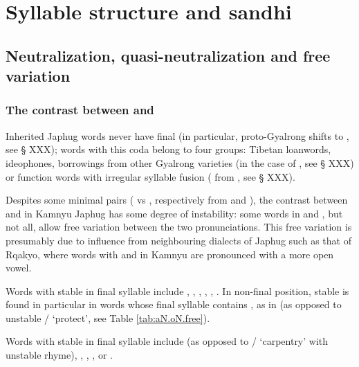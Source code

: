 \chapter{Syllable structure and sandhi} \label{sec:syllable}

\section{Neutralization, quasi-neutralization and free variation}

\subsection{The contrast between  and } \label{sec:aN.oN.free}
Inherited Japhug words never have final  (in particular, proto-Gyalrong  shifts to , see § XXX); words with this coda belong to four groups: Tibetan loanwords, ideophones, borrowings from other Gyalrong varieties (in the case of , see § XXX) or function words with irregular syllable fusion ( from , see § XXX).

Despites some minimal pairs ( vs , respectively from  and ), the contrast between  and  in Kamnyu Japhug has some degree of instability: some words in  and , but not all, allow free variation between the two pronunciations. This free variation is presumably due to influence from neighbouring dialects of Japhug such as that of Rqakyo, where words with  and  in Kamnyu are pronounced with a more open vowel.

Words with stable  in final syllable include , , , , , . In non-final position, stable   is found in particular in words whose final syllable contains , as in  (as opposed to unstable  /  `protect', see Table \ref{tab:aN.oN.free}).

Words with stable  in final syllable include  (as opposed to  /  `carpentry' with unstable rhyme), , , ,  or .

